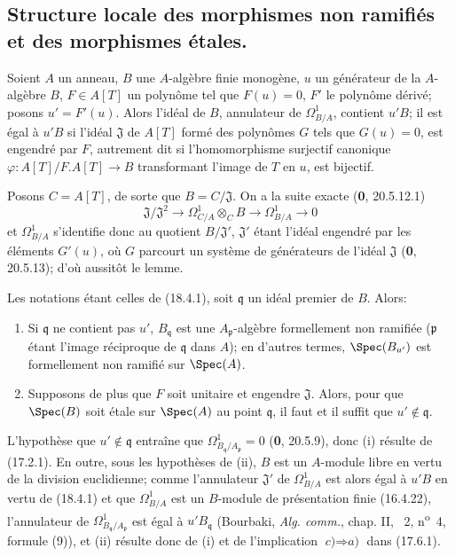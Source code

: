 
\subsection{Structure locale des morphismes non ramifiés et des morphismes étales.}

\begin{lemma}[18.4.1]
\label{IV.18.4.1}
Soient $A$ un anneau, $B$ une $A$-algèbre finie monogène, $u$ un générateur de la $A$-algèbre $B$, $F\in A[T]$ un polynôme tel que $F(u)=0$, $F'$ le polynôme dérivé; posons $u'=F'(u)$. Alors l'idéal de $B$, annulateur de $\Omega^1_{B/A}$, contient $u'B$; il est égal à $u'B$ si l'idéal $\mathfrak J$ de $A[T]$ formé des polynômes $G$ tels que $G(u)=0$, est engendré par $F$, autrement dit si l'homomorphisme surjectif canonique $\varphi:A[T]/F.A[T]\to B$ transformant l'image de $T$ en $u$, est bijectif.
\end{lemma}

Posons $C=A[T]$, de sorte que $B=C/\mathfrak J$. On a la suite exacte (\textbf{0}, 20.5.12.1)
\[
  \mathfrak J/\mathfrak J^2\longrightarrow\Omega^1_{C/A}\otimes_C B\longrightarrow\Omega^1_{B/A}\longrightarrow 0
\]
et $\Omega^1_{B/A}$ s'identifie donc au quotient $B/\mathfrak J'$, $\mathfrak J'$ étant l'idéal engendré par les éléments $G'(u)$, où $G$ parcourt un système de générateurs de l'idéal $\mathfrak J$ (\textbf{0}, 20.5.13); d'où aussitôt le lemme.

\begin{proposition}[18.4.2]
\label{IV.18.4.2}
Les notations étant celles de \textup{(18.4.1)}, soit $\mathfrak q$ un idéal premier de $B$. Alors:
\begin{enumerate}
  \item[\textup{(i)}] Si $\mathfrak q$ ne contient pas $u'$, $B_{\mathfrak q}$ est une $A_{\mathfrak p}$-algèbre formellement non ramifiée \textup{(}$\mathfrak p$ étant l'image réciproque de $\mathfrak q$ dans $A$\textup{)}; en d'autres termes, $\Spec(B_{u'})$ est formellement non ramifié sur $\Spec(A)$.
  \item[\textup{(ii)}] Supposons de plus que $F$ soit unitaire et engendre $\mathfrak J$. Alors, pour que $\Spec(B)$ soit étale sur $\Spec(A)$ au point $\mathfrak q$, il faut et il suffit que $u'\notin\mathfrak q$.
\end{enumerate}
\end{proposition}

L'hypothèse que $u'\notin\mathfrak q$ entraîne que $\Omega^1_{B_{\mathfrak q}/A_{\mathfrak p}}=0$ (\textbf{0}, 20.5.9), donc (i) résulte de (17.2.1). En outre, sous les hypothèses de (ii), $B$ est un $A$-module libre en vertu de la division euclidienne; comme l'annulateur $\mathfrak J'$ de $\Omega^1_{B/A}$ est alors égal à $u'B$ en vertu de (18.4.1) et que $\Omega^1_{B/A}$ est un $B$-module de présentation finie (16.4.22), l'annulateur de $\Omega^1_{B_{\mathfrak q}/A_{\mathfrak p}}$ est égal à $u'B_{\mathfrak q}$ (Bourbaki, \emph{Alg. comm.}, chap. II, \textsection~2, n\textsuperscript{o}~4, formule (9)), et (ii) résulte donc de (i) et de l'implication $\textit{c)}\Rightarrow\textit{a)}$ dans (17.6.1).

